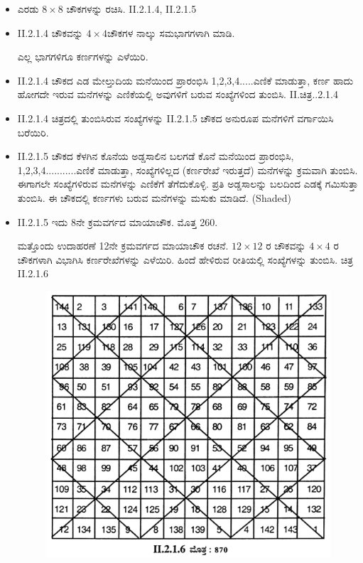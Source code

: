 \begin{itemize}
	\item ಎರಡು $8 \times 8$ ಚೌಕಗಳನ್ನು ರಚಿಸಿ. II.2.1.4, II.2.1.5
	\item II.2.1.4 ಚೌಕವನ್ನು $4 \times 4$ಚೌಕಗಳ ನಾಲ್ಕು ಸಮಭಾಗಗಳಾಗಿ ಮಾಡಿ.

	ಎಲ್ಲ ಭಾಗಗಳಿಗೂ ಕರ್ಣಗಳನ್ನು ಎಳೆಯಿರಿ.
	\item II.2.1.4 ಚೌಕದ ಎಡ ಮೇಲ್ತುದಿಯ ಮನೆಯಿಂದ ಪ್ರಾರಂಭಿಸಿ 1,2,3,4.....ಎಣಿಕೆ ಮಾಡುತ್ತಾ, ಕರ್ಣ ಹಾದು ಹೋಗದೇ ಇರುವ ಮನೆಗಳನ್ನು ಎಣಿಕೆಯಲ್ಲಿ ಅವುಗಳಿಗೆ ಬರುವ ಸಂಖ್ಯೆಗಳಿಂದ ತುಂಬಿಸಿ. II.ಚಿತ್ರ..2.1.4
	\item II.2.1.4 ಚಿತ್ರದಲ್ಲಿ ತುಂಬಿಸಿರುವ ಸಂಖ್ಯೆಗಳನ್ನು II.2.1.5 ಚೌಕದ ಅನುರೂಪ ಮನೆಗಳಿಗೆ ವರ್ಗಾಯಿಸಿ ಬರೆಯಿರಿ.
	\item II.2.1.5 ಚೌಕದ ಕೆಳಗಿನ ಕೊನೆಯ ಅಡ್ಡಸಾಲಿನ ಬಲಗಡೆ ಕೊನೆ ಮನೆಯಿಂದ ಪ್ರಾರಂಭಿಸಿ, 1,2,3,4...........ಎಣಿಕೆ ಮಾಡುತ್ತಾ, ಸಂಖ್ಯೆಗಳಿಲ್ಲದ (ಕರ್ಣರೇಖೆ ಇರುತ್ತದೆ) ಮನೆಗಳನ್ನು ಕ್ರಮವಾಗಿ ತುಂಬಿಸಿ. ಈಗಾಗಲೇ ಸಂಖ್ಯೆಗಳಿರುವ ಮನೆಗಳನ್ನು ಎಣಿಕೆಗೆ ತೆಗೆದುಕೊಳ್ಳಿ. ಪ್ರತಿ ಅಡ್ಡಸಾಲನ್ನು ಬಲದಿಂದ ಎಡಕ್ಕೆ ಗಮಿಸುತ್ತಾ ತುಂಬಿಸಿ. ಈ ಚೌಕದಲ್ಲಿ ಕರ್ಣಗಳು ಬರುವ ಮನೆಗಳನ್ನು ಮಸುಕು ಮಾಡಿದೆ. (Shaded)
	\item II.2.1.5 ಇದು 8ನೇ ಕ್ರಮವರ್ಗದ ಮಾಯಾಚೌಕ. ಮೊತ್ತ 260.

	ಮತ್ತೊಂದು ಉದಾಹರಣೆ 12ನೇ ಕ್ರಮವರ್ಗದ ಮಾಯಾಚೌಕ ರಚನೆ. $12\times 12$ ರ ಚೌಕವನ್ನು $4 \times 4$ ರ ಚೌಕಗಳಾಗಿ ವಿಭಾಗಿಸಿ ಕರ್ಣರೇಖೆಗಳನ್ನು ಎಳೆಯಿರಿ. ಹಿಂದೆ ಹೇಳಿರುವ ರೀತಿಯಲ್ಲಿ ಸಂಖ್ಯೆಗಳನ್ನು ತುಂಬಿಸಿ. ಚಿತ್ರ II.2.1.6
	\begin{figure}[h]
	\includegraphics{src/figures/chap3/fig3.19.jpg}
	\end{figure}
\end{itemize}

